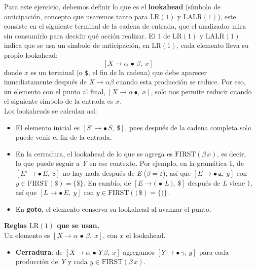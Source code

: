 \documentclass[12pt,letterpaper]{article}
\newcommand{\nt}[1]{\textit{#1}}
\newcommand{\tk}[1]{\texttt{#1}}
\newcommand{\First}[1]{\mathrm{FIRST}(#1)}
\newcommand{\lr}{\mathrm{LR(1)}}
\newcommand{\lalr}{\mathrm{LALR(1)}}
\newcommand{\eps}{\varepsilon}
\begin{document}
\begin{enumerate}[label=\arabic*.]
  \bigskip

  Para este ejercicio, debemos definir lo que es el \textbf{lookahead} (símbolo de anticipación, concepto que
  usaremos tanto para $\lr$ y $\lalr$), este consiste en el siguiente terminal de la cadena de entrada, que el
  analizador mira sin consumirlo para decidir qué acción realizar. El 1 de $\lr$ y $\lalr$ indica que
  se usa un símbolo de anticipación, en $\lr$, cada elemento lleva su propio lookahead:
  \[
  [\nt{X}\to\alpha\,\bullet\,\beta,\ x]
  \]
  donde $x$ es un terminal (o \tk{\$}, el fin de la cadena) que debe aparecer inmediatamente después de
  $\nt{X}\to\alpha\beta$ cuando esta producción se reduce. Por eso, un elemento con el punto al final,
  $[\nt{X}\to\alpha\,\bullet,\ x]$, solo nos permite reducir cuando el siguiente símbolo de la entrada es $x$.\\

  Los lookaheads se calculan así:
  \begin{itemize}
  \item El elemento inicial es $[\nt{S'}\to\bullet\,\nt{S},\ \tk{\$}]$, pues después de la cadena completa solo
    puede venir el fin de la entrada.
    
  \item En la cerradura, el lookahead de lo que se agrega es $\First{\beta\,x}$, es decir, lo que puede seguir
    a \nt{Y} en ese contexto. Por ejemplo, en la gramática 1, de $[\nt{E'}\to\bullet\,\nt{E},\ \tk{\$}]$ no hay
    nada después de \nt{E} ($\beta=\eps$), así que $[\nt{E}\to\bullet\,\tk{a},\ y]$ con
    $y\in\First{\tk{\$}}=\{\tk{\$}\}$. En cambio, de $[\nt{E}\to\tk{(}\,\bullet\,\nt{L}\,\tk{)},\ \tk{\$}]$
    después de \nt{L} viene \tk{)}, así que
    $[\nt{L}\to\bullet\,\nt{E},\ y]$ con $y\in\First{\tk{)}\,\tk{\$}}=\{\tk{)}\}$.
    
  \item En \textbf{goto}, el elemento conserva su lookahead al avanzar el punto.
  \end{itemize}

  \bigskip

  \textbf{Reglas $\lr$ que se usan.}\\
  Un elemento es $[\nt{X}\to\alpha\,\bullet\,\beta,\ x]$, con $x$ el lookahead.
  \begin{itemize}
  \item \textbf{Cerradura}: de $[\nt{X}\to\alpha\,\bullet\,\nt{Y}\,\beta,\ x]$ agregamos
    $[\nt{Y}\to\bullet\,\gamma,\ y]$ para cada producción de \nt{Y} y cada $y\in\First{\beta\,x}$.


\end{itemize}
\end{enumerate}
\end{document}
